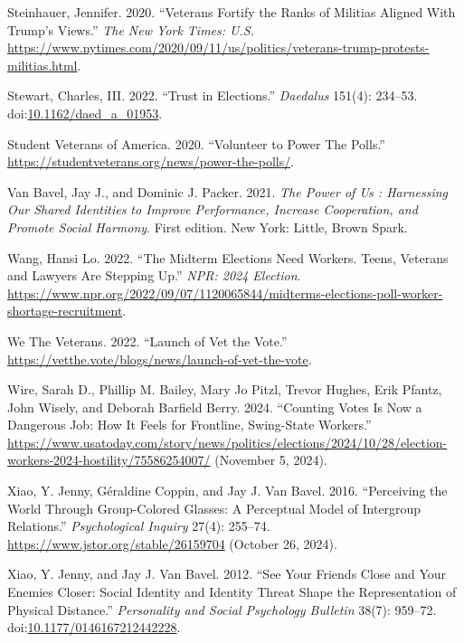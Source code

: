 \documentclass[
  11pt,
  a4paper,
]{scrartcl}
\newlength{\cslhangindent}
\newenvironment{CSLReferences}[2] %
 {\begin{list}{}{%
  \setlength{\itemindent}{0pt}
  \setlength{\leftmargin}{0pt}
  \setlength{\parsep}{0pt}
  \ifodd #1
   \setlength{\leftmargin}{\cslhangindent}
   \setlength{\itemindent}{-1\cslhangindent}
  \fi
  \setlength{\itemsep}{#2\baselineskip}}}
 {\end{list}}
\begin{document}
\begin{CSLReferences}{1}{1}
Steinhauer, Jennifer. 2020. {``Veterans {Fortify} the {Ranks} of
{Militias Aligned With Trump}'s {Views}.''} \emph{The New York Times:
U.S.}
\url{https://www.nytimes.com/2020/09/11/us/politics/veterans-trump-protests-militias.html}.

Stewart, Charles, III. 2022. {``Trust in {Elections}.''} \emph{Daedalus}
151(4): 234--53.
doi:\href{https://doi.org/10.1162/daed_a_01953}{10.1162/daed\_a\_01953}.

Student Veterans of America. 2020. {``Volunteer to {Power The Polls}.''}
\url{https://studentveterans.org/news/power-the-polls/}.

Van Bavel, Jay J., and Dominic J. Packer. 2021. \emph{The Power of Us :
Harnessing Our Shared Identities to Improve Performance, Increase
Cooperation, and Promote Social Harmony}. First edition. New York:
Little, Brown Spark.

Wang, Hansi Lo. 2022. {``The Midterm Elections Need Workers. {Teens},
Veterans and Lawyers Are Stepping Up.''} \emph{NPR: 2024 Election}.
\url{https://www.npr.org/2022/09/07/1120065844/midterms-elections-poll-worker-shortage-recruitment}.

We The Veterans. 2022. {``Launch of {Vet} the {Vote}.''}
\url{https://vetthe.vote/blogs/news/launch-of-vet-the-vote}.

Wire, Sarah D., Phillip M. Bailey, Mary Jo Pitzl, Trevor Hughes, Erik
Pfantz, John Wisely, and Deborah Barfield Berry. 2024. {``Counting Votes
Is Now a Dangerous Job: How It Feels for Frontline, Swing-State
Workers.''}
\url{https://www.usatoday.com/story/news/politics/elections/2024/10/28/election-workers-2024-hostility/75586254007/}
(November 5, 2024).

Xiao, Y. Jenny, Géraldine Coppin, and Jay J. Van Bavel. 2016.
{``Perceiving the {World Through Group-Colored Glasses}: {A Perceptual
Model} of {Intergroup Relations}.''} \emph{Psychological Inquiry} 27(4):
255--74. \url{https://www.jstor.org/stable/26159704} (October 26, 2024).

Xiao, Y. Jenny, and Jay J. Van Bavel. 2012. {``See {Your Friends Close}
and {Your Enemies Closer}: {Social Identity} and {Identity Threat Shape}
the {Representation} of {Physical Distance}.''} \emph{Personality and
Social Psychology Bulletin} 38(7): 959--72.
doi:\href{https://doi.org/10.1177/0146167212442228}{10.1177/0146167212442228}.

\end{CSLReferences}
\end{document}
